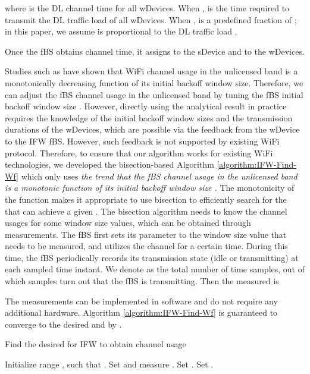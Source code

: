 \documentclass[journal,final,letterpaper,10pt,doublecolumn,twoside]{IEEEtran}
\begin{document}
where   is the DL channel time for all wDevices. When ,  is the time required to transmit the DL traffic load of all wDevices.   When ,   is a predefined fraction of ; in this paper, we assume  is proportional to the DL traffic load ,

Once the fBS obtains  channel time, it assigns  to the sDevice and  to the wDevices.

Studies such as \cite{solve_WiFi_Anomaly_letter_AdjustW} have shown that
WiFi channel usage in the unlicensed band
is a monotonically decreasing function of its initial
backoff window size.
Therefore, we can adjust the fBS channel usage  in the unlicensed band by tuning the fBS initial backoff window size .
However, directly using the analytical result \cite{solve_WiFi_Anomaly_letter_AdjustW} in practice
 requires the knowledge of the initial
backoff window sizes and the transmission durations of the wDevices, which are possible via the feedback from the wDevice to the IFW fBS. However, such feedback is not supported by existing WiFi protocol. Therefore, to ensure that our algorithm works for existing WiFi technologies, we
developed the bisection-based Algorithm \ref{algorithm:IFW-Find-Wf}
which only uses \emph{the trend that the fBS channel usage  in
the unlicensed band is a monotonic function of its initial backoff
window size .} The monotonicity of the  function
makes it appropriate to use bisection
\cite{Computing-textbook-bisection} to efficiently search for the
 that can achieve a given . The bisection algorithm needs
to know the channel usages for some window size values, which can be
obtained through measurements. The fBS first sets its parameter
 to the window size value that needs to be measured, and
utilizes the channel for a certain time. During this time, the fBS
periodically records its transmission state (idle or transmitting)
at each sampled time instant. We denote  as the total
number of time samples, out of which  samples turn out that
the fBS is transmitting. Then the measured  is

The measurements can be implemented in software and do not require
any additional hardware. Algorithm \ref{algorithm:IFW-Find-Wf} is
guaranteed to converge to the desired  and  by
\cite{Computing-textbook-bisection}.





\begin{algorithm}\caption{Find the desired  for IFW to obtain channel usage
}\label{algorithm:IFW-Find-Wf}
\begin{algorithmic}[1]




\STATE Initialize  range , such that
. \REPEAT
    \STATE Set  and measure .
    \IF {}
        \STATE Set .
    \ELSE
         \STATE Set .
    \ENDIF
{}

\end{algorithmic}
\end{algorithm}
\end{document}
